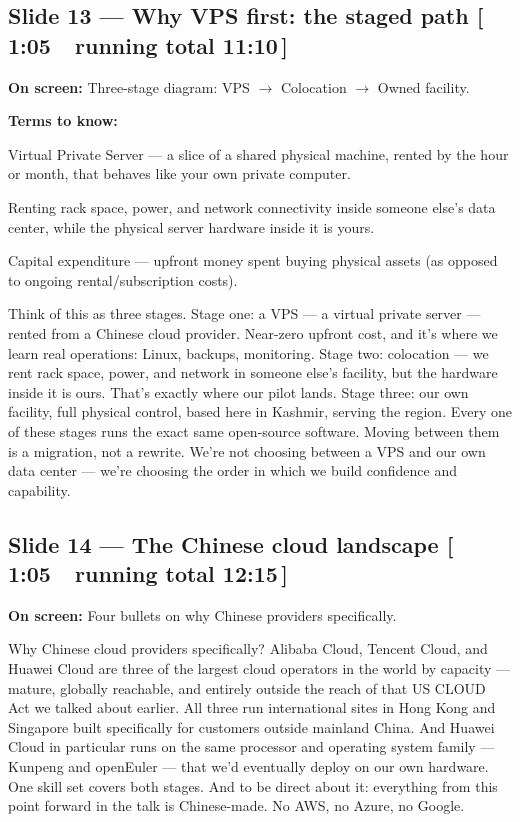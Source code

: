 \documentclass[11pt]{article}
\newcommand{\onscreen}[1]{\noindent\textbf{\color{sovGrey}On screen:} #1\par\vspace{4pt}}
\newcommand{\timing}[2]{\hfill{\normalsize\color{sovGrey}[\,#1\ \textbar\ running total #2\,]}}
\newenvironment{terms}
  {\noindent\textbf{\color{sovGrey}Terms to know:}
   \begin{description}[leftmargin=0pt,style=sameline,labelindent=0pt,itemsep=2pt,topsep=2pt,font=\normalfont\bfseries\color{sovDark}]}
  {\end{description}\vspace{2pt}}
\begin{document}
\subsection*{Slide 13 --- Why VPS first: the staged path \timing{1:05}{11:10}}
\onscreen{Three-stage diagram: VPS $\rightarrow$ Colocation $\rightarrow$ Owned facility.}
\begin{terms}
  \item[VPS] Virtual Private Server --- a slice of a shared physical machine, rented
    by the hour or month, that behaves like your own private computer.
  \item[Colocation (``colo'')] Renting rack space, power, and network connectivity
    inside someone else's data center, while the physical server hardware inside it is
    yours.
  \item[Capex] Capital expenditure --- upfront money spent buying physical assets
    (as opposed to ongoing rental/subscription costs).
\end{terms}
\begin{sayit}
Think of this as three stages. Stage one: a VPS --- a virtual private server --- rented
from a Chinese cloud provider. Near-zero upfront cost, and it's where we learn real
operations: Linux, backups, monitoring. Stage two: colocation --- we rent rack space,
power, and network in someone else's facility, but the hardware inside it is ours.
That's exactly where our pilot lands. Stage three: our own facility, full physical
control, based here in Kashmir, serving the region. Every one of these stages runs the
exact same open-source software. Moving between them is a migration, not a rewrite.
We're not choosing between a VPS and our own data center --- we're choosing the order in
which we build confidence and capability.
\end{sayit}

\subsection*{Slide 14 --- The Chinese cloud landscape \timing{1:05}{12:15}}
\onscreen{Four bullets on why Chinese providers specifically.}
\begin{sayit}
Why Chinese cloud providers specifically? Alibaba Cloud, Tencent Cloud, and Huawei Cloud
are three of the largest cloud operators in the world by capacity --- mature, globally
reachable, and entirely outside the reach of that US CLOUD Act we talked about earlier.
All three run international sites in Hong Kong and Singapore built specifically for
customers outside mainland China. And Huawei Cloud in particular runs on the same
processor and operating system family --- Kunpeng and openEuler --- that we'd eventually
deploy on our own hardware. One skill set covers both stages. And to be direct about it:
everything from this point forward in the talk is Chinese-made. No AWS, no Azure, no
Google.
\end{sayit}
\end{document}

